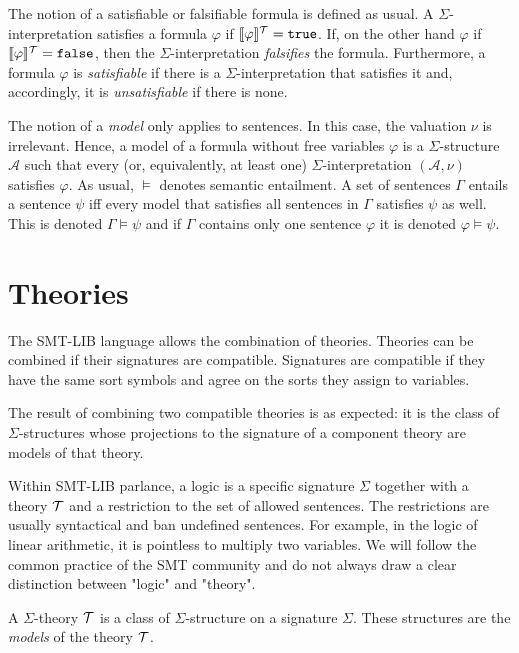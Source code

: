 The notion of a satisfiable or falsifiable formula is defined as usual. A
$\Sigma$-interpretation satisfies a formula $\varphi$ if $\llbracket \varphi \rrbracket^{\cal{T}} = \kw{true}$.
If, on the other hand $\varphi$ if $\llbracket \varphi \rrbracket^{\cal{T}} = \kw{false}$,  then the $\Sigma$-interpretation \emph{falsifies} the formula.
Furthermore, a formula $\varphi$ is \emph{satisfiable} if there is a $\Sigma$-interpretation that satisfies it and,
accordingly, it is \emph{unsatisfiable} if there is none.

The notion of a \emph{model} only applies to sentences. In this case, the valuation
$\nu$ is irrelevant. Hence, a model of a formula without free variables $\varphi$
is a $\Sigma$-structure $\mathcal{A}$ such that every (or, equivalently, at least one)
$\Sigma$-interpretation $(\mathcal{A}, \nu)$ satisfies $\varphi$. As usual, $\models$
denotes semantic entailment. A set of sentences $\Gamma$ entails a sentence $\psi$
iff every model that satisfies all sentences in $\Gamma$ satisfies $\psi$ as well.
This is denoted $\Gamma \models \psi$ and if $\Gamma$ contains only one sentence
$\varphi$ it is denoted $\varphi \models \psi$.


\section{Theories}

The SMT-LIB language allows the combination of theories.
Theories can be combined if their signatures are compatible.
Signatures are compatible if they have the same sort symbols and agree on the sorts they assign to variables.

The result of combining two compatible theories is as expected: it is the class of $\Sigma$-structures whose projections to the signature of a component theory are models of that theory.

Within SMT-LIB parlance, a logic is a specific signature $\Sigma$ together with a theory $\cal{T}$ and a restriction to the set of allowed sentences.
The restrictions are usually syntactical and ban undefined sentences.
For example, in the logic of linear arithmetic, it is pointless to multiply two variables.
We will follow the common practice of the SMT community and do not always draw a clear distinction between "logic" and "theory".

\begin{definition}[Theories]
A $\Sigma$-theory $\cal{T}$ is a class of $\Sigma$-structure on a signature $\Sigma$.
These structures are the \emph{models} of the theory $\cal{T}$.
\end{definition}


